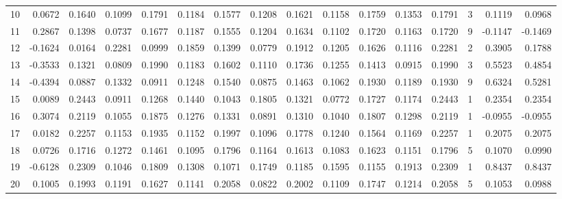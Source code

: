 \begin{tabular}{lrrrrrrrrrrrrrrr}
10  &      0.0672 &  0.1640 &  0.1099 &  0.1791 &  0.1184 &  0.1577 &  0.1208 &  0.1621 &  0.1158 &  0.1759 &   0.1353 &     0.1791 &      3 &                    0.1119 &                     0.0968 \\
11  &      0.2867 &  0.1398 &  0.0737 &  0.1677 &  0.1187 &  0.1555 &  0.1204 &  0.1634 &  0.1102 &  0.1720 &   0.1163 &     0.1720 &      9 &                   -0.1147 &                    -0.1469 \\
12  &     -0.1624 &  0.0164 &  0.2281 &  0.0999 &  0.1859 &  0.1399 &  0.0779 &  0.1912 &  0.1205 &  0.1626 &   0.1116 &     0.2281 &      2 &                    0.3905 &                     0.1788 \\
13  &     -0.3533 &  0.1321 &  0.0809 &  0.1990 &  0.1183 &  0.1602 &  0.1110 &  0.1736 &  0.1255 &  0.1413 &   0.0915 &     0.1990 &      3 &                    0.5523 &                     0.4854 \\
14  &     -0.4394 &  0.0887 &  0.1332 &  0.0911 &  0.1248 &  0.1540 &  0.0875 &  0.1463 &  0.1062 &  0.1930 &   0.1189 &     0.1930 &      9 &                    0.6324 &                     0.5281 \\
15  &      0.0089 &  0.2443 &  0.0911 &  0.1268 &  0.1440 &  0.1043 &  0.1805 &  0.1321 &  0.0772 &  0.1727 &   0.1174 &     0.2443 &      1 &                    0.2354 &                     0.2354 \\
16  &      0.3074 &  0.2119 &  0.1055 &  0.1875 &  0.1276 &  0.1331 &  0.0891 &  0.1310 &  0.1040 &  0.1807 &   0.1298 &     0.2119 &      1 &                   -0.0955 &                    -0.0955 \\
17  &      0.0182 &  0.2257 &  0.1153 &  0.1935 &  0.1152 &  0.1997 &  0.1096 &  0.1778 &  0.1240 &  0.1564 &   0.1169 &     0.2257 &      1 &                    0.2075 &                     0.2075 \\
18  &      0.0726 &  0.1716 &  0.1272 &  0.1461 &  0.1095 &  0.1796 &  0.1164 &  0.1613 &  0.1083 &  0.1623 &   0.1151 &     0.1796 &      5 &                    0.1070 &                     0.0990 \\
19  &     -0.6128 &  0.2309 &  0.1046 &  0.1809 &  0.1308 &  0.1071 &  0.1749 &  0.1185 &  0.1595 &  0.1155 &   0.1913 &     0.2309 &      1 &                    0.8437 &                     0.8437 \\
20  &      0.1005 &  0.1993 &  0.1191 &  0.1627 &  0.1141 &  0.2058 &  0.0822 &  0.2002 &  0.1109 &  0.1747 &   0.1214 &     0.2058 &      5 &                    0.1053 &                     0.0988 \\

\end{tabular}
